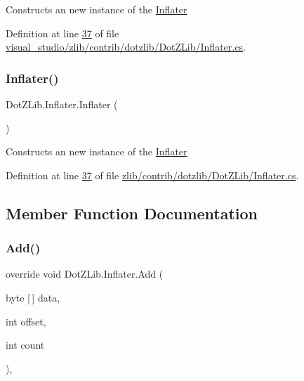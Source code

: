 Constructs an new instance of the {\ttfamily \hyperlink{class_dot_z_lib_1_1_inflater}{Inflater}} 



Definition at line \hyperlink{visual__studio_2zlib_2contrib_2dotzlib_2_dot_z_lib_2_inflater_8cs_source_l00037}{37} of file \hyperlink{visual__studio_2zlib_2contrib_2dotzlib_2_dot_z_lib_2_inflater_8cs_source}{visual\+\_\+studio/zlib/contrib/dotzlib/\+Dot\+Z\+Lib/\+Inflater.\+cs}.

\mbox{\label{class_dot_z_lib_1_1_inflater_acb40e9664a78756a3def8ed66aa35ca1}} 
\subsubsection{\texorpdfstring{Inflater()}{Inflater()}\hspace{0.1cm}{\footnotesize\ttfamily [2/2]}}
{\footnotesize\ttfamily Dot\+Z\+Lib.\+Inflater.\+Inflater (\begin{DoxyParamCaption}{ }\end{DoxyParamCaption})\hspace{0.3cm}{\ttfamily [inline]}}



Constructs an new instance of the {\ttfamily \hyperlink{class_dot_z_lib_1_1_inflater}{Inflater}} 



Definition at line \hyperlink{zlib_2contrib_2dotzlib_2_dot_z_lib_2_inflater_8cs_source_l00037}{37} of file \hyperlink{zlib_2contrib_2dotzlib_2_dot_z_lib_2_inflater_8cs_source}{zlib/contrib/dotzlib/\+Dot\+Z\+Lib/\+Inflater.\+cs}.



\subsection{Member Function Documentation}
\mbox{\label{class_dot_z_lib_1_1_inflater_a773dd62fe806dd9b6117f859faaeb079}} 
\subsubsection{\texorpdfstring{Add()}{Add()}\hspace{0.1cm}{\footnotesize\ttfamily [1/2]}}
{\footnotesize\ttfamily override void Dot\+Z\+Lib.\+Inflater.\+Add (\begin{DoxyParamCaption}\item[{byte \mbox{[}$\,$\mbox{]}}]{data,  }\item[{int}]{offset,  }\item[{int}]{count }\end{DoxyParamCaption})\hspace{0.3cm}{\ttfamily [inline]}, {\ttfamily [virtual]}}



